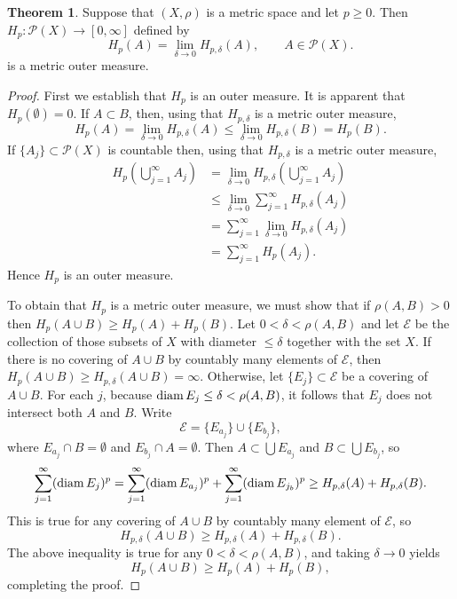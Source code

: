 \documentclass{article}
\newcommand{\diam}{\ensuremath\mathrm{diam}\,}
\theoremstyle{definition}
\newtheorem{theorem}{Theorem}
\theoremstyle{definition}
\begin{document}
\begin{theorem}
Suppose that $(X,\rho)$ is a metric space and let $p \geq 0$. Then $H_p:\mathscr{P}(X) \to [0,\infty]$
defined by
\[
H_p(A) = \lim_{\delta \to 0} H_{p,\delta}(A), \qquad A \in \mathscr{P}(X).
\]
 is a metric outer measure.
\end{theorem}
\begin{proof}
First we establish that $H_p$ is an outer measure. It is apparent that $H_p(\emptyset)=0$. If $A \subset B$, then, using that $H_{p,\delta}$ is a metric outer measure,
\[
H_p(A)=\lim_{\delta \to 0} H_{p,\delta}(A)
\leq \lim_{\delta \to 0} H_{p,\delta}(B)=H_p(B).
\]
If $\{A_j\} \subset \mathscr{P}(X)$ is countable then, using that $H_{p,\delta}$ is a metric outer measure,
\begin{align*}
H_p\left(\bigcup_{j=1}^\infty A_j \right) &= 
\lim_{\delta \to 0} H_{p,\delta} \left(\bigcup_{j=1}^\infty A_j \right) \\
&\leq \lim_{\delta \to 0} \sum_{j=1}^\infty H_{p,\delta}(A_j)\\
&=\sum_{j=1}^\infty \lim_{\delta \to 0} H_{p,\delta}(A_j)\\
&=\sum_{j=1}^\infty H_p(A_j).
\end{align*}
Hence $H_p$ is an outer measure.

To obtain that $H_p$ is a metric outer measure, we must 
show that if   $\rho(A,B)>0$ then $H_p(A \cup B) \geq H_p(A) + H_p(B)$. 
Let $0<\delta<\rho(A,B)$ and let $\mathscr{E}$ be the collection of those subsets of $X$ with diameter $\leq \delta$ together with the set $X$.
If there is no covering of $A \cup B$ by countably many elements of $\mathscr{E}$, then  
$H_p(A \cup B) \geq H_{p,\delta}(A \cup B) =\infty$. Otherwise, let $\{E_j\} \subset \mathscr{E}$ be a covering of $A \cup B$.
For each $j$, because $\diam E_j \leq \delta < \rho(A,B)$, it follows that $E_j$ does not intersect both $A$ and $B$.
Write
\[
\mathscr{E} = \{E_{a_j}\} \cup \{E_{b_j}\},
\]
where $E_{a_j} \cap B = \emptyset$ and $E_{b_j} \cap A = \emptyset$. Then $A \subset \bigcup E_{a_j}$ and 
$B \subset \bigcup E_{b_j}$, so
\[
\sum_{j=1}^\infty (\diam E_j)^p
= \sum_{j=1}^\infty (\diam E_{a_j})^p + \sum_{j=1}^\infty (\diam E_{j_b})^p
\geq H_{p,\delta}(A)+H_{p,\delta}(B).
\]
This is true for any covering of $A \cup B$ by countably many element of $\mathscr{E}$, so
\[
H_{p,\delta}(A \cup B) \geq H_{p,\delta}(A) + H_{p,\delta}(B).
\]
The above inequality is true for any $0<\delta<\rho(A,B)$, and taking $\delta \to 0$ yields
\[
H_p(A \cup B) \geq H_p(A) + H_p(B),
\]
completing the proof.
\end{proof}
\end{document}
